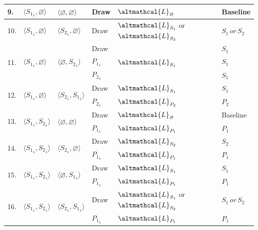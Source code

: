 \begin{table}[t]
\begin{threeparttable}
\begin{tabular}{lp{2.3cm}p{2.3cm}p{2cm}p{2cm}p{2.5cm}}
			9. & $\langle S_{1_{\lambda}}, \varnothing \rangle$ & $\langle \varnothing, \varnothing \rangle$ & Draw & $\altmathcal{L}_{\varnothing}$ & Baseline \\ \hline
			10. & $\langle S_{1_{\lambda}}, \varnothing \rangle$ & $\langle S_{2_{\lambda}}, \varnothing \rangle$ & Draw & $\altmathcal{L}_{S_1}$ or $\altmathcal{L}_{S_2}$ & $S_{1}\,or\, S_2$ \\ \hline
			\multirow{3}{*}{11.} & \multirow{3}{*}{$\langle S_{1_{\lambda}}, \varnothing \rangle$} & \multirow{3}{*}{$\langle \varnothing, S_{2_{\lambda}} \rangle$} & Draw & \multirow{3}{*}{$\altmathcal{L}_{S_1}$} & $S_1$\\
			& & & $P_{1_{\lambda}}$ & & $S_1$\\
			& & & $P_{2_{\lambda}}$ & & $S_1$\\ \hline
			\multirow{2}{*}{12.} & \multirow{2}{*}{$\langle S_{1_{\lambda}}, \varnothing \rangle$} & \multirow{2}{*}{$\langle S_{2_{\lambda}}, S_{1_{\lambda}} \rangle$} & Draw & $\altmathcal{L}_{S_1}$  & $S_1$\\
			& & & $P_{2_{\lambda}}$ & $\altmathcal{L}_{P_2}$ & $P_2$ \\ \hline
			\multirow{2}{*}{13.} & \multirow{2}{*}{$\langle S_{1_{\lambda}}, S_{2_{\lambda}} \rangle$} & \multirow{2}{*}{$\langle \varnothing, \varnothing \rangle$} & Draw & $\altmathcal{L}_{\varnothing}$  & Baseline\\
			& & & $P_{1_{\lambda}}$ & $\altmathcal{L}_{P_1}$ & $P_1$ \\ \hline
			\multirow{2}{*}{14.} & \multirow{2}{*}{$\langle S_{1_{\lambda}}, S_{2_{\lambda}} \rangle$} & \multirow{2}{*}{$\langle S_{2_{\lambda}}, \varnothing \rangle$} & Draw & $\altmathcal{L}_{S_2}$ & $S_2$\\
			& & & $P_{1_{\lambda}}$ & $\altmathcal{L}_{P_1}$  & $P_1$ \\ \hline
			\multirow{2}{*}{15.} & \multirow{2}{*}{$\langle S_{1_{\lambda}}, S_{2_{\lambda}} \rangle$} & \multirow{2}{*}{$\langle \varnothing, S_{1_{\lambda}} \rangle$} & Draw & $\altmathcal{L}_{S_1}$ & $S_1$\\
			& & & $P_{1_{\lambda}}$ & $\altmathcal{L}_{P_1}$ & $P_1$\\ \hline
			\multirow{3}{*}{16.} & \multirow{3}{*}{$\langle S_{1_{\lambda}}, S_{2_{\lambda}} \rangle$} & \multirow{3}{*}{$\langle S_{2_{\lambda}}, S_{1_{\lambda}} \rangle$} & Draw & $\altmathcal{L}_{S_1}$ or $\altmathcal{L}_{S_2}$ & $S_{1}\,or\, S_2$ \\
			& & & $P_{1_{\lambda}}$ & $\altmathcal{L}_{P_1}$ & $P_1$\\

\end{tabular}
\end{threeparttable}
\end{table}
